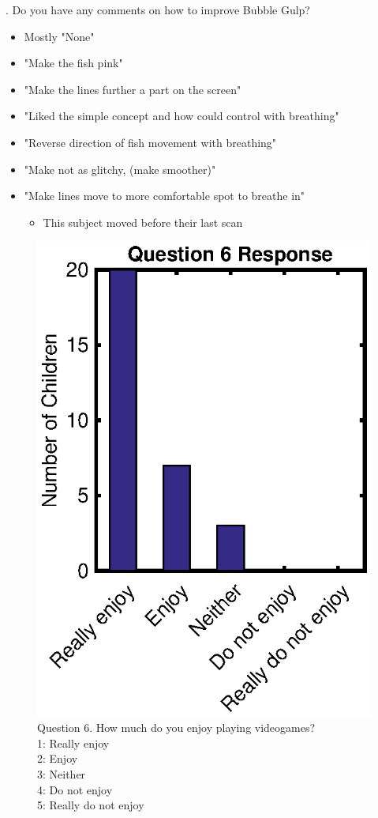 	.	Do you have any comments on how to improve Bubble Gulp?
	\begin{itemize}
		\item Mostly "None"
		\item "Make the fish pink"
		\item "Make the lines further a part on the screen"
		\item "Liked the simple concept and how could control with breathing"
		\item "Reverse direction of fish movement with breathing"
		\item "Make not as glitchy, (make smoother)"
		\item "Make lines move to more comfortable spot to breathe in"
		\begin{itemize}
			\item This subject moved before their last scan
		\end{itemize}
	\end{itemize}
	
	\begin{figure}
		\centering
		\includegraphics{figures/gamepaper/Question6}
		\caption[Survey Question 6]{Question 6. How much do you enjoy playing videogames? \\ 1: Really enjoy\\ 2: Enjoy\\ 3: Neither\\ 4: Do not enjoy \\ 5: Really do not enjoy}
		\label{fig:question6}
	\end{figure}
	
